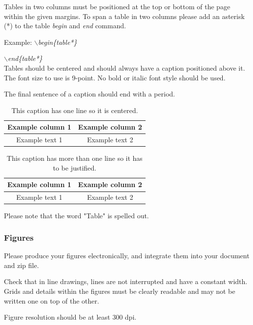 \documentclass[a4paper,twoside]{article}
\begin{document}
Tables in two columns must be positioned at the top or bottom of the
page within the given margins. To span a table in two columns please add an asterisk (*) to the table \textit{begin} and \textit{end} command.

Example: \textit{$\backslash$begin\{table*\}}

\hspace*{1.5cm}\textit{$\backslash$end\{table*\}}\\

Tables should be centered and should always have a caption
positioned above it. The font size to use is 9-point. No bold or
italic font style should be used.

The final sentence of a caption should end with a period.

\begin{table}[h]
\caption{This caption has one line so it is
centered.}\label{tab:example1} \centering
\begin{tabular}{|c|c|}
  \hline
  Example column 1 & Example column 2 \\
  \hline
  Example text 1 & Example text 2 \\
  \hline
\end{tabular}
\end{table}

\begin{table}[h]
\caption{This caption has more than one line so it has to be
justified.}\label{tab:example2} \centering
\begin{tabular}{|c|c|}
  \hline
  Example column 1 & Example column 2 \\
  \hline
  Example text 1 & Example text 2 \\
  \hline
\end{tabular}
\end{table}

Please note that the word "Table" is spelled out.


\subsubsection{Figures}

Please produce your figures electronically, and integrate them into
your document and zip file.

Check that in line drawings, lines are not interrupted and have a
constant width. Grids and details within the figures must be clearly
readable and may not be written one on top of the other.

Figure resolution should be at least 300 dpi.
\end{document}
